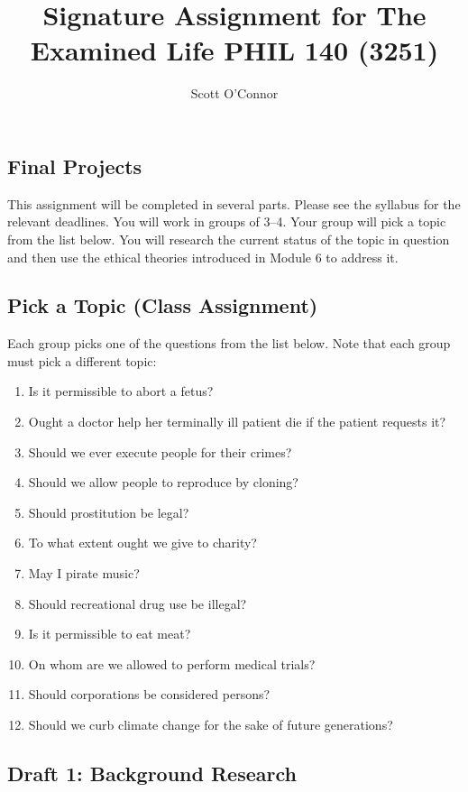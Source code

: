 \documentclass[]{article}
\title{Signature Assignment for The Examined Life PHIL 140 (3251)}
\author{Scott O’Connor}
\providecommand{\tightlist}{%
  \setlength{\itemsep}{0pt}\setlength{\parskip}{0pt}}
\begin{document}
\maketitle

\subsection{Final Projects}\label{final-projects}

This assignment will be completed in several parts. Please see the
syllabus for the relevant deadlines. You will work in groups of 3--4.
Your group will pick a topic from the list below. You will research the
current status of the topic in question and then use the ethical
theories introduced in Module 6 to address it.

\subsection{Pick a Topic (Class
Assignment)}\label{pick-a-topic-class-assignment}

Each group picks one of the questions from the list below. Note that
each group must pick a different topic:

\begin{enumerate}
\def\labelenumi{\arabic{enumi}.}
\tightlist
\item
  Is it permissible to abort a fetus?
\item
  Ought a doctor help her terminally ill patient die if the patient
  requests it?
\item
  Should we ever execute people for their crimes?
\item
  Should we allow people to reproduce by cloning?
\item
  Should prostitution be legal?
\item
  To what extent ought we give to charity?
\item
  May I pirate music?
\item
  Should recreational drug use be illegal?
\item
  Is it permissible to eat meat?
\item
  On whom are we allowed to perform medical trials?
\item
  Should corporations be considered persons?
\item
  Should we curb climate change for the sake of future generations?
\end{enumerate}

\subsection{Draft 1: Background
Research}\label{draft-1-background-research}
\end{document}
